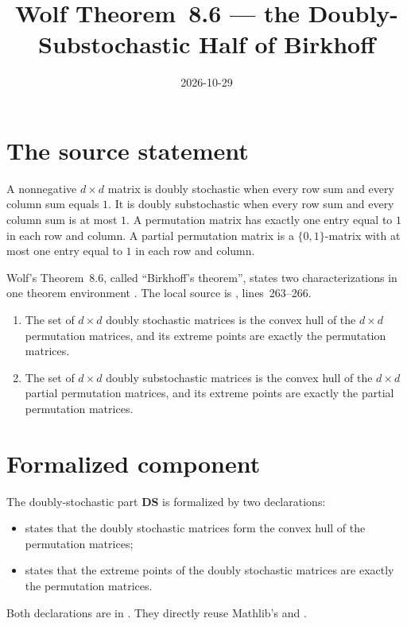 \documentclass{article}
\title{Wolf Theorem~8.6 --- the Doubly-Substochastic Half of Birkhoff}
\author{}
\date{2026-10-29}
\begin{document}
\maketitle
{}

\section{The source statement}

A nonnegative $d\times d$ matrix is doubly stochastic when every row sum and
every column sum equals $1$. It is doubly substochastic when every row sum and
every column sum is at most $1$. A permutation matrix has exactly one entry
equal to $1$ in each row and column. A partial permutation matrix is a
$\{0,1\}$-matrix with at most one entry equal to $1$ in each row and column.

Wolf's Theorem~8.6, called ``Birkhoff's theorem'', states two
characterizations in one theorem environment
\cite[Chapter~8, Theorem~8.6]{Wolf2012Quantum}. The local source is
,
lines~263--266.
\begin{enumerate}
    \item[\textbf{DS}] The set of $d\times d$ doubly stochastic matrices is
        the convex hull of the $d\times d$ permutation matrices, and its
        extreme points are exactly the permutation matrices.

    \item[\textbf{Sub}] The set of $d\times d$ doubly substochastic matrices
        is the convex hull of the $d\times d$ partial permutation matrices,
        and its extreme points are exactly the partial permutation matrices.
\end{enumerate}

\section{Formalized component}

The doubly-stochastic part \textbf{DS} is formalized by two declarations:
\begin{itemize}
    \item {} states
        that the doubly stochastic matrices form the convex hull of the
        permutation matrices;

    \item {} states
        that the extreme points of the doubly stochastic matrices are
        exactly the permutation matrices.
\end{itemize}
Both declarations are in
. They directly reuse Mathlib's
 and
.
\end{document}

